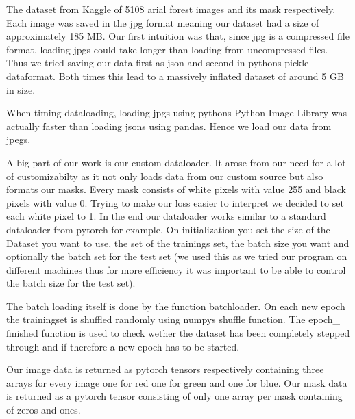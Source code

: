 The dataset from Kaggle of 5108 arial forest images and its mask respectively. Each image was saved in the jpg format meaning our dataset had a size of approximately 185 MB. 
Our first intuition was that, since jpg is a compressed file format, loading jpgs could take longer than loading from uncompressed files. Thus we tried saving our data first as json and second in pythons pickle dataformat. Both times this lead to a massively inflated dataset of around 5 GB in size.

When timing dataloading, loading jpgs using pythons Python Image Library was actually faster than loading jsons using pandas. Hence we load our data from jpegs.

A big part of our work is our custom dataloader. It arose from our need for a lot of customizabilty as it not only loads data from our custom source but also formats our masks. Every mask consists of white pixels with value 255 and black pixels with value 0. Trying to make our loss easier to interpret we decided to set each white pixel to 1.
In the end our dataloader works similar to a standard dataloader from pytorch for example. 
On initialization you set the size of the Dataset you want to use, the set of the trainings set, the batch size you want and optionally the batch set for the test set (we used this as we tried our program on different machines thus for more efficiency it was important to be able to control the batch size for the test set).

The batch loading itself is done by the function batchloader. On each new epoch the trainingset is shuffled randomly using numpys shuffle function. The epoch\_ finished function is used to check wether the dataset has been completely stepped through and if therefore a new epoch has to be started.

Our image data is returned as pytorch tensors respectively containing three arrays for every image one for red one for green and one for blue. Our mask data is returned as a pytorch tensor consisting of only one array per mask containing of zeros and ones.